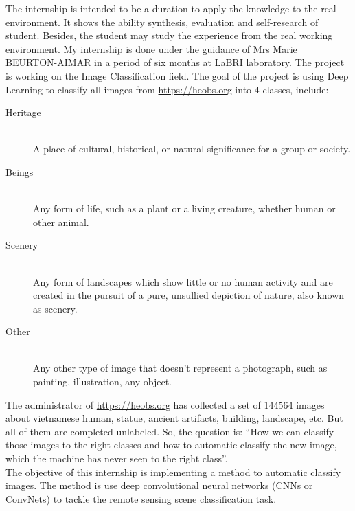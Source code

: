 \documentclass[hidelinks,12pt,a4paper]{report}
\begin{document}
The internship is intended to be a duration to apply the knowledge to the real environment. It shows the ability synthesis, evaluation and self-research of student. Besides, the student may study the experience from the real working environment. My internship is done under the
guidance of Mrs Marie BEURTON-AIMAR in a period of six months at LaBRI laboratory.
The project is working on the Image Classification field. The goal of the project is using Deep Learning to classify all images from \href{https://heobs.org}{https://heobs.org} into 4 classes, include:
\begin{description}
\item[Heritage] \hfill \\ A place of cultural, historical, or natural significance for a group or society.
\item[Beings] \hfill \\ Any form of life, such as a plant or a living creature, whether human or other animal.
\item[Scenery] \hfill \\ Any form of landscapes which show little or no human activity and are created in the pursuit of a pure, unsullied depiction of nature, also known as scenery.
\item[Other] \hfill \\ Any other type of image that doesn't represent a photograph, such as painting, illustration, any object.	
\end{description}
The administrator of \href{https://heobs.org}{https://heobs.org} has collected a set of 144564 images about vietnamese human, statue, ancient artifacts, building, landscape, etc. But all of them are completed unlabeled. So, the question is: ``How we can classify those images to the right classes and how to automatic classify the new image, which the machine has never seen to the right class''.\\
The objective of this internship is implementing a method to automatic classify images.
The method is use deep convolutional neural networks (CNNs or ConvNets) to tackle the remote sensing scene classification task.
\newpage
\end{document}
